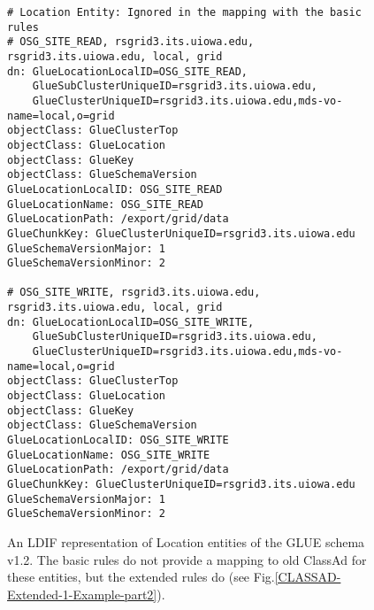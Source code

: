 \documentclass[12pt]{article}
\begin{document}
\begin{figure}
\scriptsize
\begin{verbatim}
# Location Entity: Ignored in the mapping with the basic rules
# OSG_SITE_READ, rsgrid3.its.uiowa.edu, rsgrid3.its.uiowa.edu, local, grid
dn: GlueLocationLocalID=OSG_SITE_READ,
    GlueSubClusterUniqueID=rsgrid3.its.uiowa.edu,
    GlueClusterUniqueID=rsgrid3.its.uiowa.edu,mds-vo-name=local,o=grid
objectClass: GlueClusterTop
objectClass: GlueLocation
objectClass: GlueKey
objectClass: GlueSchemaVersion
GlueLocationLocalID: OSG_SITE_READ
GlueLocationName: OSG_SITE_READ
GlueLocationPath: /export/grid/data
GlueChunkKey: GlueClusterUniqueID=rsgrid3.its.uiowa.edu
GlueSchemaVersionMajor: 1
GlueSchemaVersionMinor: 2

# OSG_SITE_WRITE, rsgrid3.its.uiowa.edu, rsgrid3.its.uiowa.edu, local, grid
dn: GlueLocationLocalID=OSG_SITE_WRITE,
    GlueSubClusterUniqueID=rsgrid3.its.uiowa.edu,
    GlueClusterUniqueID=rsgrid3.its.uiowa.edu,mds-vo-name=local,o=grid
objectClass: GlueClusterTop
objectClass: GlueLocation
objectClass: GlueKey
objectClass: GlueSchemaVersion
GlueLocationLocalID: OSG_SITE_WRITE
GlueLocationName: OSG_SITE_WRITE
GlueLocationPath: /export/grid/data
GlueChunkKey: GlueClusterUniqueID=rsgrid3.its.uiowa.edu
GlueSchemaVersionMajor: 1
GlueSchemaVersionMinor: 2
\end{verbatim}
\normalsize \caption[Example of an LDIF Representation of the
Location entity of the GLUE Schema]{\label{LDIF-Location-Example} An
LDIF representation of Location entities of the GLUE schema v1.2.
The basic rules do not provide a mapping to old ClassAd for these
entities, but the extended rules do (see
Fig.\ref{CLASSAD-Extended-1-Example-part2}).}
\end{figure}
\end{document}
